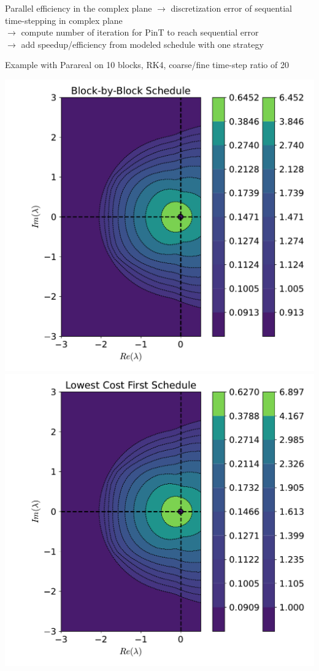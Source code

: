 \documentclass[11pt,aspectratio=43]{beamer}
\begin{document}
\begin{frame}{Parallel efficiency in the complex plane}
	$\rightarrow$ discretization error of sequential time-stepping in complex plane\\
	$\rightarrow$ compute number of iteration for PinT to reach sequential error\\
	$\rightarrow$ add speedup/efficiency from modeled schedule with one strategy\\\vskip5pt
	
	Example with Parareal on 10 blocks, RK4, coarse/fine time-step ratio of 20
	\begin{center}
		\includegraphics[width=0.5\linewidth]{Block-by-Block_Schedule.pdf}%
		\includegraphics[width=0.5\linewidth]{Lowest_Cost_First_Schedule.pdf}%
	\end{center} 
\end{frame}
\end{document}
